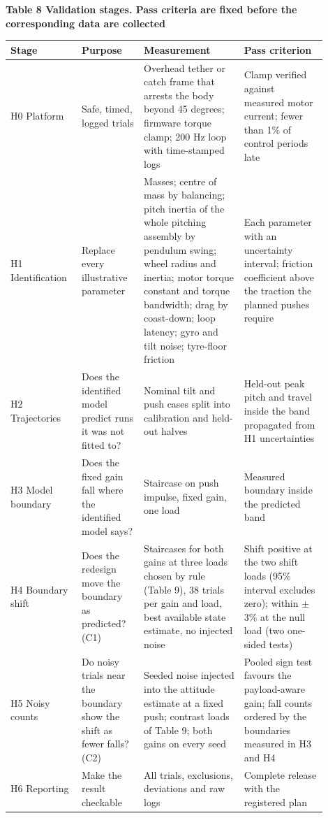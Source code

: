 \documentclass[11pt,a4paper]{article}
\begin{document}
\textbf{Table 8 Validation stages. Pass criteria are fixed before the corresponding data are collected}
\begin{longtable}{p{0.171\linewidth}p{0.189\linewidth}p{0.297\linewidth}p{0.243\linewidth}}
\toprule
Stage & Purpose & Measurement & Pass criterion \\ \midrule \endhead
H0 Platform & Safe, timed, logged trials & Overhead tether or catch frame that arrests the body beyond 45 degrees; firmware torque clamp; 200 Hz loop with time-stamped logs & Clamp verified against measured motor current; fewer than 1\% of control periods late \\
H1 Identification & Replace every illustrative parameter & Masses; centre of mass by balancing; pitch inertia of the whole pitching assembly by pendulum swing; wheel radius and inertia; motor torque constant and torque bandwidth; drag by coast-down; loop latency; gyro and tilt noise; tyre-floor friction & Each parameter with an uncertainty interval; friction coefficient above the traction the planned pushes require \\
H2 Trajectories & Does the identified model predict runs it was not fitted to? & Nominal tilt and push cases split into calibration and held-out halves & Held-out peak pitch and travel inside the band propagated from H1 uncertainties \\
H3 Model boundary & Does the fixed gain fall where the identified model says? & Staircase on push impulse, fixed gain, one load & Measured boundary inside the predicted band \\
H4 Boundary shift & Does the redesign move the boundary as predicted? (C1) & Staircases for both gains at three loads chosen by rule (Table 9), 38 trials per gain and load, best available state estimate, no injected noise & Shift positive at the two shift loads (95\% interval excludes zero); within \ensuremath{\pm}3\% at the null load (two one-sided tests) \\
H5 Noisy counts & Do noisy trials near the boundary show the shift as fewer falls? (C2) & Seeded noise injected into the attitude estimate at a fixed push; contrast loads of Table 9; both gains on every seed & Pooled sign test favours the payload-aware gain; fall counts ordered by the boundaries measured in H3 and H4 \\
H6 Reporting & Make the result checkable & All trials, exclusions, deviations and raw logs & Complete release with the registered plan \\
\bottomrule
\end{longtable}
\end{document}
